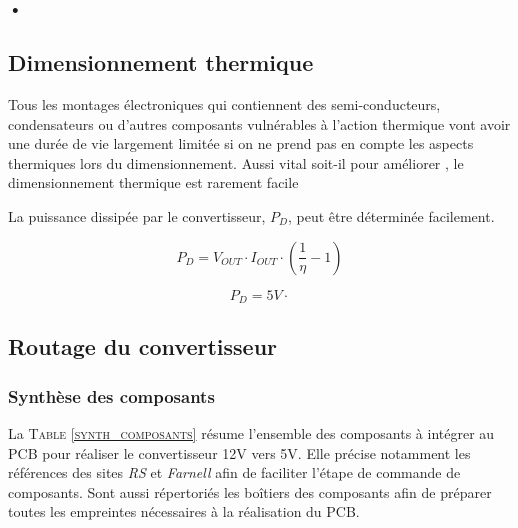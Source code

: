 				\subsubsection{•}
				
			
			\subsection{Dimensionnement thermique}
			
			Tous les montages électroniques qui contiennent des semi-conducteurs, condensateurs ou d'autres composants vulnérables à l'action thermique vont avoir une durée de vie largement limitée si on ne prend pas en compte les aspects thermiques lors du dimensionnement. Aussi vital soit-il pour améliorer , le dimensionnement thermique est rarement facile 	
			
			La puissance dissipée par le convertisseur, $P_D$, peut être déterminée facilement.
			
			\begin{equation}
				P_D = V_{OUT}\cdot I_{OUT}\cdot\left(\frac{1}{\eta}-1\right)
			\end{equation}	
			
			\begin{equation}
				P_D  = 5V\cdot
			\end{equation}							
			
			
			
			\subsection{Routage du convertisseur}
			
				\subsubsection{Synthèse des composants}
				
				La \textsc{Table \ref{synth_composants}} résume l'ensemble des composants à intégrer au PCB pour réaliser le convertisseur 12V vers 5V. Elle précise notamment les références des sites \textit{RS} et \textit{Farnell} afin de faciliter l'étape de commande de composants. Sont aussi répertoriés les boîtiers des composants afin de préparer toutes les empreintes nécessaires à la réalisation du PCB.
				
